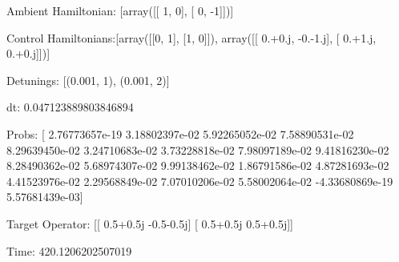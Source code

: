 \documentclass{article}
\begin{document}
    

\newpage

Ambient Hamiltonian: [array([[ 1,  0],
       [ 0, -1]])]

Control Hamiltonians:[array([[0, 1],
       [1, 0]]), array([[ 0.+0.j, -0.-1.j],
       [ 0.+1.j,  0.+0.j]])]

Detunings: [(0.001, 1), (0.001, 2)]

 dt: 0.047123889803846894

Probs: [  2.76773657e-19   3.18802397e-02   5.92265052e-02   7.58890531e-02
   8.29639450e-02   3.24710683e-02   3.73228818e-02   7.98097189e-02
   9.41816230e-02   8.28490362e-02   5.68974307e-02   9.99138462e-02
   1.86791586e-02   4.87281693e-02   4.41523976e-02   2.29568849e-02
   7.07010206e-02   5.58002064e-02  -4.33680869e-19   5.57681439e-03]

Target Operator: [[ 0.5+0.5j -0.5-0.5j]
 [ 0.5+0.5j  0.5+0.5j]]

Time: 420.1206202507019
\end{document}
